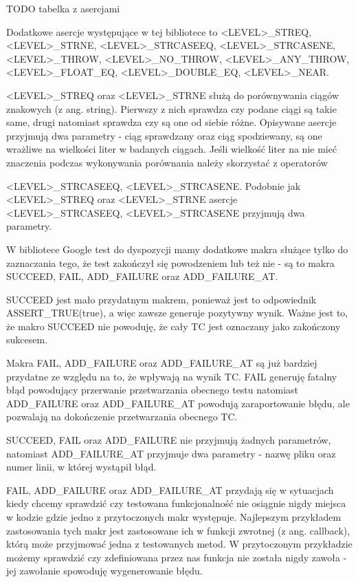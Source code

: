 \documentclass[12pt,a4paper,notitlepage]{report}
\begin{document}
TODO tabelka z asercjami

Dodatkowe asercje występujące w tej bibliotece to <LEVEL>{\_}STREQ, <LEVEL>{\_}STRNE, <LEVEL>{\_}STRCASEEQ, <LEVEL>{\_}STRCASENE, <LEVEL>{\_}THROW, <LEVEL>{\_}NO{\_}THROW, <LEVEL>{\_}ANY{\_}THROW, <LEVEL>{\_}FLOAT{\_}EQ, <LEVEL>{\_}DOUBLE{\_}EQ, <LEVEL>{\_}NEAR.

<LEVEL>{\_}STREQ oraz <LEVEL>{\_}STRNE służą do porównywania ciągów znakowych (z ang. string). Pierwszy z nich sprawdza czy podane ciągi są takie same, drugi natomiast sprawdza czy są one od siebie różne. Opisywane asercje przyjmują dwa parametry - ciąg sprawdzany oraz ciąg spodziewany, są one wrażliwe na wielkości liter w badanych ciągach. Jeśli wielkość liter na nie mieć znaczenia podczas wykonywania porównania należy skorzystać z operatorów 

<LEVEL>{\_}STRCASEEQ, <LEVEL>{\_}STRCASENE. Podobnie jak <LEVEL>{\_}STREQ oraz <LEVEL>{\_}STRNE asercje <LEVEL>{\_}STRCASEEQ, <LEVEL>{\_}STRCASENE przyjmują dwa parametry.

W bibliotece Google test do dyspozycji mamy dodatkowe makra służące tylko do zaznaczania tego, że test zakończył się powodzeniem lub też nie - są to makra SUCCEED, FAIL, ADD{\_}FAILURE oraz ADD{\_}FAILURE{\_}AT.

SUCCEED jest mało przydatnym makrem, ponieważ jest to odpowiednik ASSERT{\_}TRUE(true), a więc zawsze generuje pozytywny wynik. Ważne jest to, że makro SUCCEED nie powoduję, że cały TC jest oznaczany jako zakończony sukcesem.

Makra FAIL, ADD{\_}FAILURE oraz ADD{\_}FAILURE{\_}AT są już bardziej przydatne ze względu na to, że wpływają na wynik TC. FAIL generuję fatalny błąd powodujący przerwanie przetwarzania obecnego testu natomiast ADD{\_}FAILURE oraz ADD{\_}FAILURE{\_}AT powodują zaraportowanie błędu, ale pozwalają na dokończenie przetwarzania obecnego TC.

SUCCEED, FAIL oraz ADD{\_}FAILURE nie przyjmują żadnych parametrów, natomiast ADD{\_}FAILURE{\_}AT przyjmuje dwa parametry - nazwę pliku oraz numer linii, w której wystąpił błąd.

FAIL, ADD{\_}FAILURE oraz ADD{\_}FAILURE{\_}AT przydają się w sytuacjach kiedy chcemy sprawdzić czy testowana funkcjonalność nie osiągnie nigdy miejsca w kodzie gdzie jedno z przytoczonych makr występuje. Najlepszym przykładem zastosowania tych makr jest zastosowane ich w funkcji zwrotnej (z ang. callback), którą może przyjmować jedna z testowanych metod. W przytoczonym przykładzie możemy sprawdzić czy zdefiniowana przez nas funkcja nie została nigdy zawoła - jej zawołanie spowoduję wygenerowanie błędu.
\end{document}
